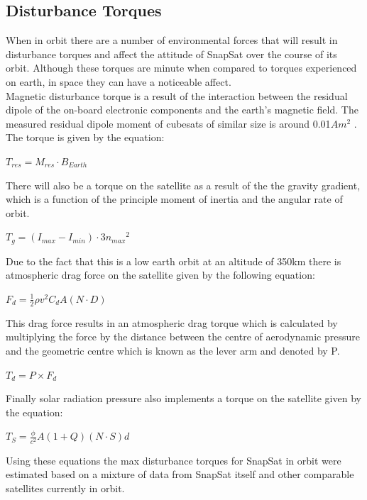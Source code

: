 \subsection{Disturbance Torques}
When in orbit there are a number of environmental forces that will result in disturbance torques and affect the attitude of SnapSat over the course of its orbit.  Although these torques are minute when compared to torques experienced on earth, in space they can have a noticeable affect.\\
Magnetic disturbance torque is a result of the interaction between the residual dipole of the on-board electronic components and the earth's magnetic field.  The measured residual dipole moment of cubesats of similar size is around 0.01$Am^2$ \cite{Miller}.  The torque is given by the equation:
\begin{center}
    $T_{res} = M_{res} \cdot B_{Earth}$
\end{center} 
There will also be a torque on the satellite as a result of the the gravity gradient, which is a function of the principle moment of inertia and the angular rate of orbit.
\begin{center}
    $T_g = (I_{max} - I_{min}) \cdot 3 {n_{max}}^2$
\end{center}
Due to the fact that this is a low earth orbit at an altitude of 350km there is atmospheric drag force on the satellite given by the following equation:
\begin{center}
    $F_d = \frac{1}{2} \rho v^2 C_d A (N \cdot D)$
\end{center}
This drag force results in an atmospheric drag torque which is calculated by multiplying the force by the distance between the centre of aerodynamic pressure and the geometric centre which is known as the lever arm and denoted by P.   
\begin{center}
    $T_d = P \times F_d$
\end{center}
Finally solar radiation pressure also implements a torque on the satellite given by the equation:
\begin{center}
    $T_S = \frac{\phi}{c^2} A (1 + Q)(N\cdot S)d$
\end{center}
Using these equations the max disturbance torques for SnapSat in orbit were estimated based on a mixture of data from SnapSat itself and other comparable satellites currently in orbit. 
